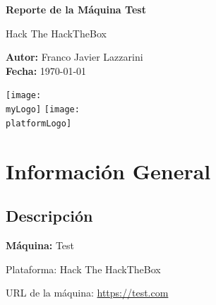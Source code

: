 \documentclass[12pt,a4paper]{report}
\newcommand{\machineName}{Test}
\newcommand{\machineURL}{https://test.com}
\newcommand{\platformName}{Hack The HackTheBox} %
\newcommand{\authorName}{Franco Javier Lazzarini}
\newcommand{\myLogo}{images/my_logo.png}          %
\newcommand{\platformLogo}{images/platform_logo.png} %
\newcommand{\reportDate}{\today}                  %
\begin{document}
\begin{titlepage}
    \centering
    \vspace*{3cm}

    {\huge \textbf{Reporte de la Máquina \machineName}\\[1em]}
    
    {\Large \platformName}\\[1em]
    
    \vfill
    
    \textbf{Autor:} \authorName \\
    \textbf{Fecha:} \reportDate \\
    
    \vspace*{2cm}
    
    \texttt{[image: \\myLogo]}
    \hspace{0.5cm}
    \texttt{[image: \\platformLogo]}
    
    \vfill
    \thispagestyle{empty} %
\end{titlepage}

\pagestyle{general}   %
\setcounter{page}{1}  %

\tableofcontents
\clearpage

\chapter{Información General}

\section{Descripción}
\textbf{Máquina:} \machineName

Plataforma: \platformName

URL de la máquina: \href{\machineURL}{\machineURL}
\end{document}
